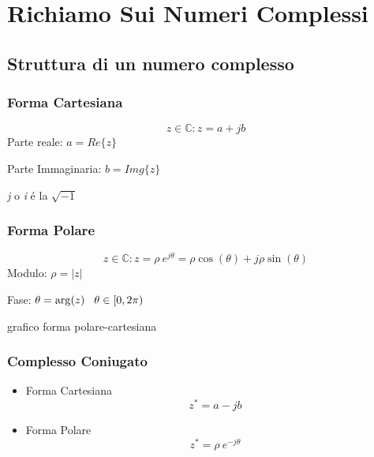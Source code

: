 \section{Richiamo Sui Numeri Complessi}
\subsection{Struttura di un numero complesso}

    \subsubsection{Forma Cartesiana}
            \begin{center}
                \[
                  z \in \mathbb{C} : z = a + jb
                \]
                Parte reale: $a=Re\{z\}$


                \vspace{0.1cm}
                Parte Immaginaria: $b=Img\{z\}$

                \vspace{0.1cm}
                {\em j} o {\em i} é la $\sqrt{-1}$  
            \end{center}
            
    \subsubsection{Forma Polare}
        \begin{center}
            \[
                z \in \mathbb{C} : z = \rho \ e^{j\theta} = \rho \cos(\theta) + j\rho\sin(\theta)
            \]
            Modulo: $\rho = |z|$


            \vspace{0.1cm}
            Fase: $\theta = \arg(z) \hspace{0.3cm} \theta \in [0,2\pi)$
        \end{center}    
        grafico forma polare-cartesiana
        
    \subsubsection{Complesso Coniugato}
        \begin{itemize}
            \item {Forma Cartesiana   
                    \[
                        z^* = a - jb
                    \]
            }
            \item {Forma Polare
                    \[
                        z^* = \rho \ e^{-j\theta}
                    \]
            }           
        \end{itemize}


